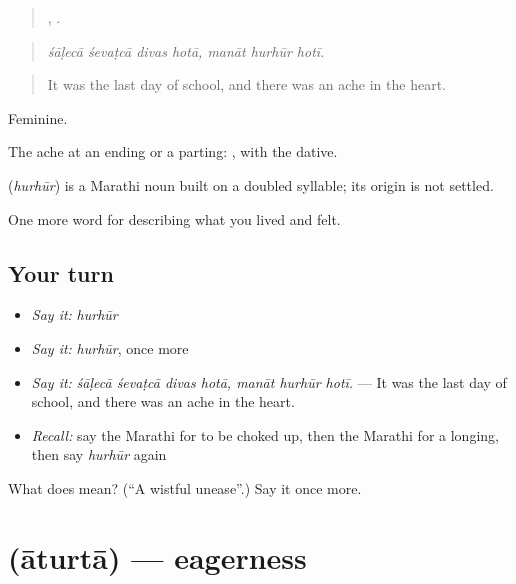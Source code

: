 \begin{quote}
   ,   .
\end{quote}

\begin{quote}
\emph{śāḷecā śevaṭcā divas hotā, manāt hurhūr hotī.}
\end{quote}

\begin{quote}
It was the last day of school, and there was an ache in the heart.
\end{quote}

Feminine.

The ache at an ending or a parting:  , with the dative.

\begin{cousinweb}
\textbf{} (\emph{hurhūr}) is a Marathi noun built on a doubled syllable; its origin is not settled.
\end{cousinweb}

\begin{grammarlens}[title={What you've built}]
One more word for describing what you lived and felt.
\end{grammarlens}

\subsection*{Your turn}
\begin{itemize}
\raggedright
  \item \emph{Say it:} \emph{hurhūr}
  \item \emph{Say it:} \emph{hurhūr}, once more
  \item \emph{Say it:} \emph{śāḷecā śevaṭcā divas hotā, manāt hurhūr hotī.} — It was the last day of school, and there was an ache in the heart.
  \item \emph{Recall:} say the Marathi for to be choked up, then the Marathi for a longing, then say \emph{hurhūr} again
\end{itemize}

\begin{tcolorbox}[breakable,colback=teal!4,colframe=teal!35!black,title={Before you move on}]
What does  mean? (\textquotedblleft{}A wistful unease\textquotedblright{}.) Say it once more.
\end{tcolorbox}
\section[\texorpdfstring{\mr{आतुरता} (āturtā)}{आतुरता (āturtā)}]{ (āturtā) — eagerness}

